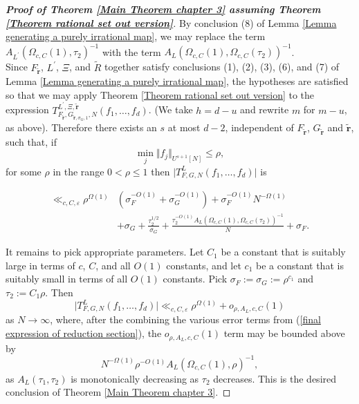 \documentclass[12pt,a4paper,twoside,reqno]{amsart}
\numberwithin{equation}{section}
\begin{document}
\begin{proof}[\textbf{Proof of Theorem \ref{Main Theorem chapter 3} assuming Theorem \ref{Theorem rational set out version}}]
By conclusion (8) of Lemma \ref{Lemma generating a purely irrational map}, we may replace the term $A_{L^\prime}(\Omega_{c,C}(1),\tau_2)^{-1}$ with the term $A_{L}(\Omega_{c,C}(1),\Omega_{c,C}(\tau_2))^{-1}$. \\

Since $F_{\widetilde{\mathbf{r}}}$, $L^\prime$, $\Xi$, and $\widetilde{R}$ together satisfy conclusions (1), (2), (3), (6), and (7) of Lemma \ref{Lemma generating a purely irrational map}, the hypotheses are satisfied so that we may apply Theorem \ref{Theorem rational set out version} to the expression $T_{F_{\widetilde{\mathbf{r}}},G_{\widetilde{\mathbf{r}},\sigma_G,1},N}^{L^\prime,\Xi,\widetilde{\mathbf{r}}}(f_1,\dots,f_d)$. (We take $h = d-u$ and rewrite $m$ for $m-u$, as above). Therefore there exists an $s$ at most $d-2$, independent of $F_{\widetilde{\mathbf{r}}}$, $ G_{\widetilde{\mathbf{r}}}$ and $\widetilde{\mathbf{r}}$, such that, if \[ \min_j \Vert f_j\Vert_{U^{s+1}[N]} \leqslant \rho,\] for some $\rho$ in the range $0<\rho \leqslant 1$ then $\vert T_{F,G,N}^L(f_1,\dots,f_d)\vert$ is 

\begin{align}
\label{final expression of reduction section}
\ll_{c,C,\varepsilon} \rho^{\Omega(1)}& (\sigma_F^{-O(1)} + \sigma_G^{-O(1)}) + \sigma_F^{-O(1)}N^{-\Omega(1)} \nonumber \\
&+ \sigma_G + \frac{\tau_2^{1/2}}{\sigma _G} +  \frac{\tau_2^{-O(1)}A_L(\Omega_{c,C}(1),\Omega_{c,C}(\tau_2))^{-1}}{N} + \sigma_F.
\end{align}


It remains to pick appropriate parameters. Let $C_1$ be a constant that is suitably large in terms of $c$, $C$, and all $O(1)$ constants, and let $c_1$ be a constant that is suitably small in terms of all $O(1)$ constants. Pick $\sigma_F := \sigma_G := \rho^{c_1}$ and $\tau_2 :=  C_1 \rho$. Then \[ \vert T_{F,G,N}^L(f_1,\dots,f_d)\vert \ll_{c,C,\varepsilon} \rho^{\Omega(1)} + o_{\rho,A_L,c,C}(1)\] as $N\rightarrow \infty$, where, after the combining the various error terms from (\ref{final expression of reduction section}), the $o_{\rho,A_L,c,C}(1)$ term may be bounded above by \[N^{-\Omega(1)} \rho^{-O(1)}A_L(\Omega_{c,C}(1), \rho)^{-1},\] as $A_L(\tau_1,\tau_2)$ is monotonically decreasing as $\tau_2$ decreases. This is the desired conclusion of Theorem \ref{Main Theorem chapter 3}.  
\end{proof}
\end{document}
